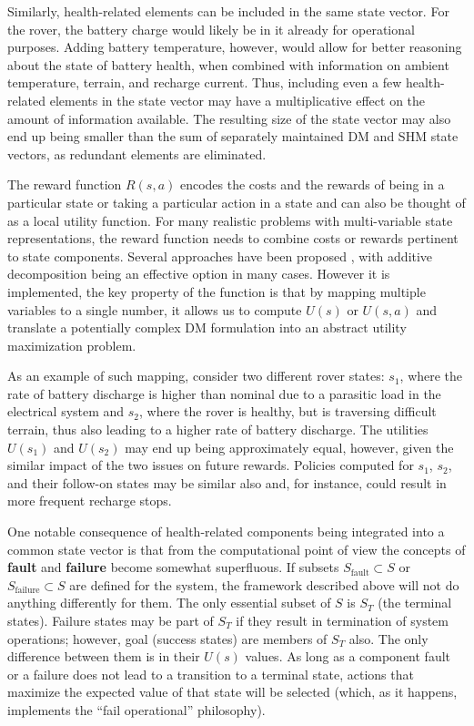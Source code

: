 Similarly, health-related elements can be included in the same state vector. For the rover, the battery charge would likely be in it already for operational purposes. Adding battery temperature, however, would allow for better reasoning about the state of battery health, when combined with information on ambient temperature, terrain, and recharge current. Thus, including even a few health-related elements in the state vector may have a multiplicative effect on the amount of information available. The resulting size of the state vector may also end up being smaller than the sum of separately maintained DM and SHM state vectors, as redundant elements are eliminated.

The reward function $R(s,a)$ encodes the costs and the rewards of being in a particular state or taking a particular action in a state and can also be thought of as a local utility function. For many realistic problems with multi-variable state representations, the reward function needs to combine costs or rewards pertinent to state components. Several approaches have been proposed \cite{Keeney1993}, with additive decomposition being an effective option in many cases. However it is implemented, the key property of the function is that by mapping multiple variables to a single number, it allows us to compute $U(s)$ or $U(s,a)$ and translate a potentially complex DM formulation into an abstract utility maximization problem.

As an example of such mapping, consider two different rover states: $s_1$, where the rate of battery discharge is higher than nominal due to a parasitic load in the electrical system and $s_2$, where the rover is healthy, but is traversing difficult terrain, thus also leading to a higher rate of battery discharge. The utilities $U(s_1)$ and $U(s_2)$ may end up being approximately equal, however, given the similar impact of the two issues on future rewards. Policies computed for $s_1$, $s_2$, and their follow-on states may be similar also and, for instance, could result in more frequent recharge stops.

One notable consequence of health-related components being integrated into a common state vector is that from the computational point of view the concepts of \textbf{fault} and \textbf{failure} become somewhat superfluous. If subsets $S_\text{fault} \subset S$ or $S_\text{failure} \subset S$ are defined for the system, the framework described above will not do anything differently for them. The only essential subset of $S$ is $S_T$ (the terminal states). Failure states may be part of $S_T$ if they result in termination of system operations; however, goal (success states) are members of $S_T$ also. The only difference between them is in their $U(s)$ values. As long as a component fault or a failure does not lead to a transition to a terminal state, actions that maximize the expected value of that state will be selected (which, as it happens, implements the ``fail operational'' philosophy).

